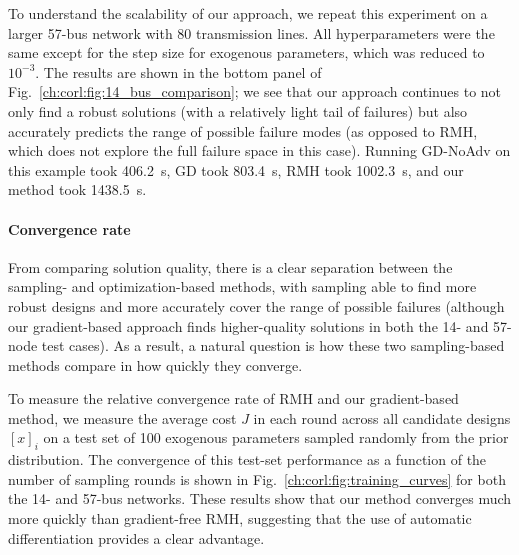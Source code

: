 {To understand the scalability of our approach, we repeat this experiment on a larger 57-bus network with 80 transmission lines. All hyperparameters were the same except for the step size for exogenous parameters, which was reduced to $10^{-3}$. The results are shown in the bottom panel of Fig.~\ref{ch:corl:fig:14_bus_comparison}; we see that our approach continues to not only find a robust solutions (with a relatively light tail of failures) but also accurately predicts the range of possible failure modes (as opposed to RMH, which does not explore the full failure space in this case). Running GD-NoAdv on this example took \SI{406.2}{s}, GD took \SI{803.4}{s}, RMH took \SI{1002.3}{s}, and our method took \SI{1438.5}{s}.

\paragraph{Convergence rate} From comparing solution quality, there is a clear separation between the sampling- and optimization-based methods, with sampling able to find more robust designs and more accurately cover the range of possible failures (although our gradient-based approach finds higher-quality solutions in both the 14- and 57-node test cases). As a result, a natural question is how these two sampling-based methods compare in how quickly they converge.

To measure the relative convergence rate of RMH and our gradient-based method, we measure the average cost $J$ in each round across all candidate designs $[x]_i$ on a test set of 100 exogenous parameters sampled randomly from the prior distribution. The convergence of this test-set performance as a function of the number of sampling rounds is shown in Fig.~\ref{ch:corl:fig:training_curves} for both the 14- and 57-bus networks. These results show that our method converges much more quickly than gradient-free RMH, suggesting that the use of automatic differentiation provides a clear advantage.

}
